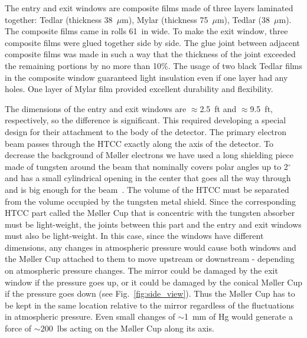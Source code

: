 The entry and exit windows are composite films made of three layers laminated together: Tedlar (thickness
38~$\mu$m), Mylar (thickness 75~$\mu$m), Tedlar (38~$\mu$m). The composite films came in rolls 61~in
wide. To make the exit window, three composite films were glued together side by side. The glue joint between
adjacent composite films was made in such a way that the thickness of the joint exceeded the remaining portions
by no more than 10\%. The usage of two black Tedlar films in the composite window guaranteed light insulation
even if one layer had any holes. One layer of Mylar film provided excellent durability and flexibility.

The dimensions of the entry and exit windows are $\approx$2.5~ft and $\approx$9.5~ft, respectively, so the
difference is significant. This required developing a special design for their attachment to the body of the
detector. The primary electron beam passes through the HTCC exactly along the axis of the detector. To
decrease the background of M{\o}ller electrons we have used a long shielding piece made of tungsten around
the beam that nominally covers polar angles up to 2$^\circ$ and has a small cylindrical opening in the center that
goes all the way through and is big enough for the beam~\cite{beamline-nim}. The volume of the HTCC must be
separated from the volume occupied by the tungsten metal shield. Since the corresponding HTCC part called the
M{\o}ller Cup that is concentric with the tungsten absorber must be light-weight, the joints between this part and
the entry and exit windows must also be light-weight. In this case, since the windows have different dimensions, any
changes in atmospheric pressure would cause both windows and the M{\o}ller Cup attached to them to move upstream
or downstream - depending on atmospheric pressure changes. The mirror could be damaged by the exit window if the
pressure goes up, or it could be damaged by the conical M{\o}ller  Cup if the pressure goes down (see
Fig.~\ref{fig:side_view}). Thus the M{\o}ller Cup has to be kept in the same location relative to the mirror
regardless of the fluctuations in atmospheric pressure. Even small changes of $\sim$1~mm of Hg would generate
a force of $\sim$200~lbs acting on the M{\o}ller Cup along its axis.  


